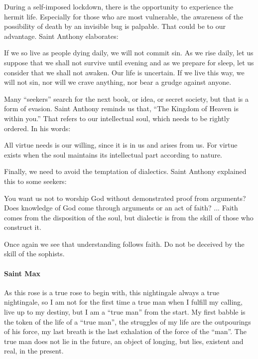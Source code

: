 During a self-imposed lockdown, there is the opportunity to experience the hermit life. Especially for those who are most vulnerable, the awareness of the possibility of death by an invisible bug is palpable. That could be to our advantage. Saint Anthony elaborates:

\begin{quotex}
If we so live as people dying daily, we will not commit sin. As we rise daily, let us suppose that we shall not survive until evening and as we prepare for sleep, let us consider that we shall not awaken. Our life is uncertain. If we live this way, we will not sin, nor will we crave anything, nor bear a grudge against anyone.
\end{quotex}


Many ``seekers'' search for the next book, or idea, or secret society, but that is a form of evasion. Saint Anthony reminds us that, ``The Kingdom of Heaven is within you.'' That refers to our intellectual soul, which needs to be rightly ordered. In his words:

\begin{quotex}
All virtue needs is our willing, since it is in us and arises from us. For virtue exists when the soul maintains its intellectual part according to nature.
\end{quotex}


Finally, we need to avoid the temptation of dialectics. Saint Anthony explained this to some seekers:

\begin{quotex}
You want us not to worship God without demonstrated proof from arguments? Does knowledge of God come through arguments or an act of faith? ... Faith comes from the disposition of the soul, but dialectic is from the skill of those who construct it.
\end{quotex}


Once again we see that understanding follows faith. Do not be deceived by the skill of the sophists.

\paragraph{Saint Max}

\begin{quotex}
As this rose is a true rose to begin with, this nightingale always a true nightingale, so I am not for the first time a true man when I fulfill my calling, live up to my destiny, but I am a ``true man'' from the start. My first babble is the token of the life of a ``true man'', the struggles of my life are the outpourings of his force, my last breath is the last exhalation of the force of the ``man''. The true man does not lie in the future, an object of longing, but lies, existent and real, in the present. 
\end{quotex}

